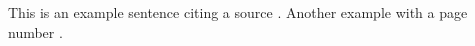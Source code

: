 \documentclass{article}
\begin{document}
This is an example sentence citing a source \parencite{example-source}.
Another example with a page number \parencite{example-source}.

\printbibliography
\end{document}
